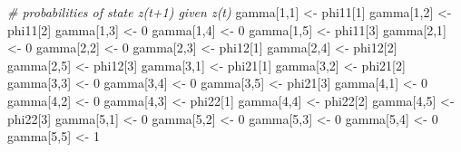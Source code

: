 \documentclass[
  12pt,
]{krantz}
\newenvironment{Shaded}{\begin{snugshade}}{\end{snugshade}}
\newcommand{\CommentTok}[1]{\textcolor[rgb]{0.56,0.35,0.01}{\textit{#1}}}
\newcommand{\DecValTok}[1]{\textcolor[rgb]{0.00,0.00,0.81}{#1}}
\newcommand{\NormalTok}[1]{#1}
\newcommand{\OtherTok}[1]{\textcolor[rgb]{0.56,0.35,0.01}{#1}}
\begin{document}
\begin{Shaded}
\begin{Highlighting}[]
  \CommentTok{\# probabilities of state z(t+1) given z(t)}
\NormalTok{  gamma[}\DecValTok{1}\NormalTok{,}\DecValTok{1}\NormalTok{] }\OtherTok{\textless{}{-}}\NormalTok{ phi11[}\DecValTok{1}\NormalTok{]}
\NormalTok{  gamma[}\DecValTok{1}\NormalTok{,}\DecValTok{2}\NormalTok{] }\OtherTok{\textless{}{-}}\NormalTok{ phi11[}\DecValTok{2}\NormalTok{]}
\NormalTok{  gamma[}\DecValTok{1}\NormalTok{,}\DecValTok{3}\NormalTok{] }\OtherTok{\textless{}{-}} \DecValTok{0}
\NormalTok{  gamma[}\DecValTok{1}\NormalTok{,}\DecValTok{4}\NormalTok{] }\OtherTok{\textless{}{-}} \DecValTok{0}
\NormalTok{  gamma[}\DecValTok{1}\NormalTok{,}\DecValTok{5}\NormalTok{] }\OtherTok{\textless{}{-}}\NormalTok{ phi11[}\DecValTok{3}\NormalTok{]}
\NormalTok{  gamma[}\DecValTok{2}\NormalTok{,}\DecValTok{1}\NormalTok{] }\OtherTok{\textless{}{-}} \DecValTok{0}
\NormalTok{  gamma[}\DecValTok{2}\NormalTok{,}\DecValTok{2}\NormalTok{] }\OtherTok{\textless{}{-}} \DecValTok{0}
\NormalTok{  gamma[}\DecValTok{2}\NormalTok{,}\DecValTok{3}\NormalTok{] }\OtherTok{\textless{}{-}}\NormalTok{ phi12[}\DecValTok{1}\NormalTok{]}
\NormalTok{  gamma[}\DecValTok{2}\NormalTok{,}\DecValTok{4}\NormalTok{] }\OtherTok{\textless{}{-}}\NormalTok{ phi12[}\DecValTok{2}\NormalTok{]}
\NormalTok{  gamma[}\DecValTok{2}\NormalTok{,}\DecValTok{5}\NormalTok{] }\OtherTok{\textless{}{-}}\NormalTok{ phi12[}\DecValTok{3}\NormalTok{]}
\NormalTok{  gamma[}\DecValTok{3}\NormalTok{,}\DecValTok{1}\NormalTok{] }\OtherTok{\textless{}{-}}\NormalTok{ phi21[}\DecValTok{1}\NormalTok{]}
\NormalTok{  gamma[}\DecValTok{3}\NormalTok{,}\DecValTok{2}\NormalTok{] }\OtherTok{\textless{}{-}}\NormalTok{ phi21[}\DecValTok{2}\NormalTok{]}
\NormalTok{  gamma[}\DecValTok{3}\NormalTok{,}\DecValTok{3}\NormalTok{] }\OtherTok{\textless{}{-}} \DecValTok{0}
\NormalTok{  gamma[}\DecValTok{3}\NormalTok{,}\DecValTok{4}\NormalTok{] }\OtherTok{\textless{}{-}} \DecValTok{0}
\NormalTok{  gamma[}\DecValTok{3}\NormalTok{,}\DecValTok{5}\NormalTok{] }\OtherTok{\textless{}{-}}\NormalTok{ phi21[}\DecValTok{3}\NormalTok{]}
\NormalTok{  gamma[}\DecValTok{4}\NormalTok{,}\DecValTok{1}\NormalTok{] }\OtherTok{\textless{}{-}} \DecValTok{0}
\NormalTok{  gamma[}\DecValTok{4}\NormalTok{,}\DecValTok{2}\NormalTok{] }\OtherTok{\textless{}{-}} \DecValTok{0}
\NormalTok{  gamma[}\DecValTok{4}\NormalTok{,}\DecValTok{3}\NormalTok{] }\OtherTok{\textless{}{-}}\NormalTok{ phi22[}\DecValTok{1}\NormalTok{]}
\NormalTok{  gamma[}\DecValTok{4}\NormalTok{,}\DecValTok{4}\NormalTok{] }\OtherTok{\textless{}{-}}\NormalTok{ phi22[}\DecValTok{2}\NormalTok{]}
\NormalTok{  gamma[}\DecValTok{4}\NormalTok{,}\DecValTok{5}\NormalTok{] }\OtherTok{\textless{}{-}}\NormalTok{ phi22[}\DecValTok{3}\NormalTok{]}
\NormalTok{  gamma[}\DecValTok{5}\NormalTok{,}\DecValTok{1}\NormalTok{] }\OtherTok{\textless{}{-}} \DecValTok{0}
\NormalTok{  gamma[}\DecValTok{5}\NormalTok{,}\DecValTok{2}\NormalTok{] }\OtherTok{\textless{}{-}} \DecValTok{0}
\NormalTok{  gamma[}\DecValTok{5}\NormalTok{,}\DecValTok{3}\NormalTok{] }\OtherTok{\textless{}{-}} \DecValTok{0}
\NormalTok{  gamma[}\DecValTok{5}\NormalTok{,}\DecValTok{4}\NormalTok{] }\OtherTok{\textless{}{-}} \DecValTok{0}
\NormalTok{  gamma[}\DecValTok{5}\NormalTok{,}\DecValTok{5}\NormalTok{] }\OtherTok{\textless{}{-}} \DecValTok{1}
  

\end{Highlighting}
\end{Shaded}
\end{document}

